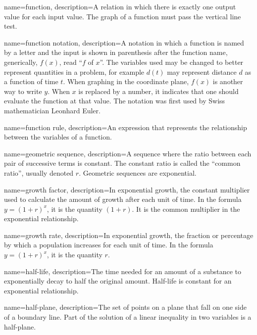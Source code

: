  {
	name=function,
	description={A relation in which there is exactly one output value for each input value. The graph of a function must pass the vertical line test.}
}

 {
	name=function notation,
	description={A notation in which a function is named by a letter and the input is shown in parenthesis after the function name, generically, $f(x)$, read ``$f$ of $x$''. The variables used may be changed to better represent quantities in a problem, for example $d(t)$ may represent distance $d$ as a function of time $t$. When graphing in the \gls{coordinate plane}, $f(x)$ is another way to write $y$. When $x$ is replaced by a number, it indicates that one should evaluate the function at that value. The notation was first used by Swiss mathematician Leonhard Euler.}
}

 {
	name=function rule,
	description={An expression that represents the relationship between the variables of a function.}
}


 {
	name=geometric sequence,
	description={A sequence where the ratio between each pair of successive terms is constant. The constant ratio is called the ``common ratio'', usually denoted $r$. Geometric sequences are exponential.}
}

 {
	name=growth factor,
	description={In exponential growth, the constant multiplier used to calculate the amount of growth after each unit of time. In the formula $y = (1+r)^x$, it is the quantity $(1+r)$. It is the common multiplier in the exponential relationship.}
}

 {
	name=growth rate,
	description={In exponential growth, the fraction or percentage by which a population increases for each unit of time. In the formula $y = (1+r)^x$, it is the quantity $r$.}
}

 {
	name=half-life,
	description={The time needed for an amount of a substance to exponentially decay to half the original amount. Half-life is constant for an exponential relationship.}
}

 {
	name=half-plane,
	description={The set of points on a plane that fall on one side of a boundary line. Part of the solution of a linear inequality in two variables is a half-plane.}
}

